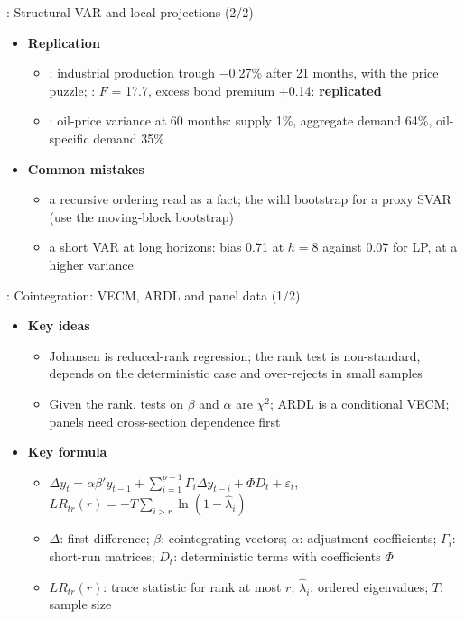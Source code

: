 \begin{frame}{: Structural VAR and local projections (2/2)}
\itemsize{\small}
\begin{itemize}
    \item \textbf{Replication}
    \begin{itemize}
        \item {}: industrial production trough \ensuremath{-}0.27\% after 21 months, with the price puzzle; : $F$ = 17.7, excess bond premium +0.14: \textbf{replicated}
        \item {}: oil-price variance at 60 months: supply 1\%, aggregate demand 64\%, oil-specific demand 35\%
    \end{itemize}
    \item \textbf{Common mistakes}
    \begin{itemize}
        \item a recursive ordering read as a fact; the wild bootstrap for a proxy SVAR (use the moving-block bootstrap)
        \item a short VAR at long horizons: bias 0.71 at $h = 8$ against 0.07 for LP, at a higher variance
    \end{itemize}
\end{itemize}
\end{frame}

\begin{frame}{: Cointegration: VECM, ARDL and panel data (1/2)}
\itemsize{\footnotesize}
\begin{itemize}
    \item \textbf{Key ideas}
    \begin{itemize}
        \item Johansen is reduced-rank regression; the rank test is non-standard, depends on the deterministic case and over-rejects in small samples
        \item Given the rank, tests on $\beta$ and $\alpha$ are $\chi^2$; ARDL is a conditional VECM; panels need cross-section dependence first
    \end{itemize}
    \item \textbf{Key formula}
    \begin{itemize}
        \item $\Delta y_t = \alpha\beta'y_{t-1} + \sum_{i=1}^{p-1}\Gamma_i\Delta y_{t-i} + \Phi D_t + \varepsilon_t$, $LR_{tr}(r) = -T\sum_{i>r}\ln(1 - \hat\lambda_i)$
        \item $\Delta$: first difference; $\beta$: cointegrating vectors; $\alpha$: adjustment coefficients; $\Gamma_i$: short-run matrices; $D_t$: deterministic terms with coefficients $\Phi$
        \item $LR_{tr}(r)$: trace statistic for rank at most $r$; $\hat\lambda_i$: ordered eigenvalues; $T$: sample size
    \end{itemize}
\end{itemize}
\end{frame}

